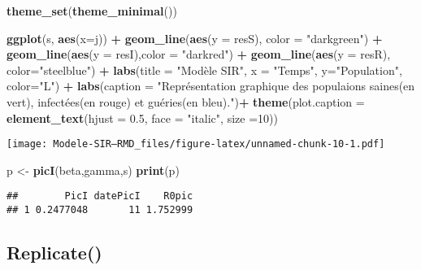 \documentclass[
]{article}
\newenvironment{Shaded}{\begin{snugshade}}{\end{snugshade}}
\newcommand{\DataTypeTok}[1]{\textcolor[rgb]{0.13,0.29,0.53}{#1}}
\newcommand{\DecValTok}[1]{\textcolor[rgb]{0.00,0.00,0.81}{#1}}
\newcommand{\FloatTok}[1]{\textcolor[rgb]{0.00,0.00,0.81}{#1}}
\newcommand{\KeywordTok}[1]{\textcolor[rgb]{0.13,0.29,0.53}{\textbf{#1}}}
\newcommand{\NormalTok}[1]{#1}
\newcommand{\OperatorTok}[1]{\textcolor[rgb]{0.81,0.36,0.00}{\textbf{#1}}}
\newcommand{\StringTok}[1]{\textcolor[rgb]{0.31,0.60,0.02}{#1}}
\begin{document}
\begin{Shaded}
\begin{Highlighting}[]
\KeywordTok{theme_set}\NormalTok{(}\KeywordTok{theme_minimal}\NormalTok{())}

\KeywordTok{ggplot}\NormalTok{(s, }\KeywordTok{aes}\NormalTok{(}\DataTypeTok{x=}\NormalTok{j)) }\OperatorTok{+}\StringTok{ }\KeywordTok{geom_line}\NormalTok{(}\KeywordTok{aes}\NormalTok{(}\DataTypeTok{y =}\NormalTok{ resS), }\DataTypeTok{color =} \StringTok{"darkgreen"}\NormalTok{) }\OperatorTok{+}\StringTok{ }\KeywordTok{geom_line}\NormalTok{(}\KeywordTok{aes}\NormalTok{(}\DataTypeTok{y =}\NormalTok{ resI),}\DataTypeTok{color =} \StringTok{"darkred"}\NormalTok{) }\OperatorTok{+}\StringTok{ }\KeywordTok{geom_line}\NormalTok{(}\KeywordTok{aes}\NormalTok{(}\DataTypeTok{y =}\NormalTok{ resR), }\DataTypeTok{color=}\StringTok{"steelblue"}\NormalTok{) }\OperatorTok{+}\StringTok{ }\KeywordTok{labs}\NormalTok{(}\DataTypeTok{title =} \StringTok{"Modèle SIR"}\NormalTok{, }\DataTypeTok{x =} \StringTok{"Temps"}\NormalTok{, }\DataTypeTok{y=}\StringTok{"Population"}\NormalTok{, }\DataTypeTok{color=}\StringTok{"L"}\NormalTok{) }\OperatorTok{+}\StringTok{ }\KeywordTok{labs}\NormalTok{(}\DataTypeTok{caption =} \StringTok{"Représentation graphique des populaions saines(en vert), infectées(en rouge) et guéries(en bleu)."}\NormalTok{)}\OperatorTok{+}\StringTok{ }\KeywordTok{theme}\NormalTok{(}\DataTypeTok{plot.caption =} \KeywordTok{element_text}\NormalTok{(}\DataTypeTok{hjust =} \FloatTok{0.5}\NormalTok{, }\DataTypeTok{face =} \StringTok{"italic"}\NormalTok{, }\DataTypeTok{size =}\DecValTok{10}\NormalTok{))}
\end{Highlighting}
\end{Shaded}

\texttt{[image: Modele-SIR---RMD\_files/figure-latex/unnamed-chunk-10-1.pdf]}

\begin{Shaded}
\begin{Highlighting}[]
\NormalTok{p <-}\StringTok{ }\KeywordTok{picI}\NormalTok{(beta,gamma,s)}
\KeywordTok{print}\NormalTok{(p)}
\end{Highlighting}
\end{Shaded}

\begin{verbatim}
##        PicI datePicI    R0pic
## 1 0.2477048       11 1.752999
\end{verbatim}

\hypertarget{replicate}{%
\subsection{Replicate()}\label{replicate}}
\end{document}
